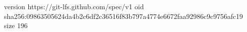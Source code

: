 version https://git-lfs.github.com/spec/v1
oid sha256:09863505624da4b2c6df2c36516f83b797a4774e6672faa92986c9c9756afc19
size 196
